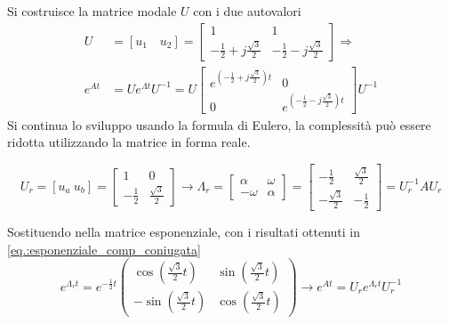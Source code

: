 Si costruisce la matrice modale $U$ con i due autovalori
$$\begin{aligned}
U &= [u_1 \quad u_2] = \begin{bmatrix}
1 & 1 \\
-\frac{1}{2}+j\frac{\sqrt{3}}{2} & -\frac{1}{2}-j\frac{\sqrt{3}}{2}
\end{bmatrix}\Rightarrow \\
e^{At} &= Ue^{\Lambda t} U^{-1} = U\begin{bmatrix}
e^{\left(-\frac{1}{2}+j\frac{\sqrt{3}}{2}\right)t} & 0\\
0 & e^{\left(-\frac{1}{2}-j\frac{\sqrt{3}}{2}\right)t}
\end{bmatrix}U^{-1}
\end{aligned}$$
Si continua lo sviluppo usando la formula di Eulero, la complessità
può essere ridotta utilizzando la matrice in forma reale.

$$
U_r = [u_a \ u_b] = \begin{bmatrix}
1 & 0 \\
-\frac{1}{2} & \frac{\sqrt{3}}{2}
\end{bmatrix} \longrightarrow \Lambda_r =\begin{bmatrix}
\alpha & \omega \\
-\omega & \alpha
\end{bmatrix}=
\begin{bmatrix}
-\frac{1}{2} & \frac{\sqrt{3}}{2}\\
-\frac{\sqrt{3}}{2} & -\frac{1}{2}
\end{bmatrix} = U_r^{-1}AU_r
$$

Sostituendo nella matrice esponenziale, con i risultati ottenuti in
\ref{eq.:esponenziale_comp_coniugata}
$$
e^{\Lambda_r t} = e^{-\frac{1}{2}t}\begin{pmatrix}
\cos \left(\frac{\sqrt{3}}{2}t\right) & \sin \left(\frac{\sqrt{3}}{2}t\right) \\
-\sin \left(\frac{\sqrt{3}}{2}t\right) & \cos \left(\frac{\sqrt{3}}{2}t\right)
\end{pmatrix}\rightarrow
e^{At} = U_r e^{\Lambda_r t} U_r^{-1}
$$

